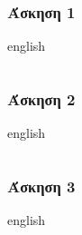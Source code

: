 \documentclass{assignment}
\begin{document}
\maketitle

\newpage\subsubsection*{Άσκηση 1}

\begin{otherlanguage*}{english}
\inputminted[fontsize=\scriptsize]{text}{exercise1.asm}
\end{otherlanguage*}

\newpage\subsubsection*{Άσκηση 2}

\begin{otherlanguage*}{english}
\inputminted[fontsize=\scriptsize]{text}{exercise2.asm}
\end{otherlanguage*}

\newpage\subsubsection*{Άσκηση 3}

\begin{otherlanguage*}{english}
\inputminted[fontsize=\scriptsize]{text}{exercise3.asm}
\end{otherlanguage*}
\end{document}
